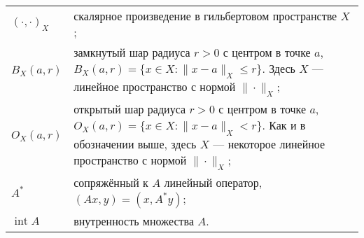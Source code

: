 \documentclass[../main.tex]{subfiles}
\begin{document}
\begin{tabularx}{\textwidth}{lY}
 $(\cdot,\cdot)_{X}$ & скалярное произведение в гильбертовом пространстве $X$; \\
 
 $B_X(a,r)$ & замкнутый шар радиуса $r>0$ с центром в точке $a$, $B_X(a, r) = \{x\in X: \|x-a\|_X \leqslant r \}$. Здесь $X$ --- линейное пространство с нормой $\|\cdot\|_X$; \\
 
 $O_{X}(a, r)$ & открытый шар радиуса $r>0$ с центром в точке $a$, $O_{X}(a, r) = \{x\in X: \|x-a\|_X < r \}$. Как и в обозначении выше, здесь $X$ --- некоторое линейное пространство с нормой $\|\cdot\|_X$; \\
 
 $ A^* $ & сопряжённый к $A$ линейный оператор, $(Ax, y) = (x, A^*y)$; \\
 
 $ \operatorname{int}A $ & внутренность множества $A$. \\
\end{tabularx}
\end{document}
